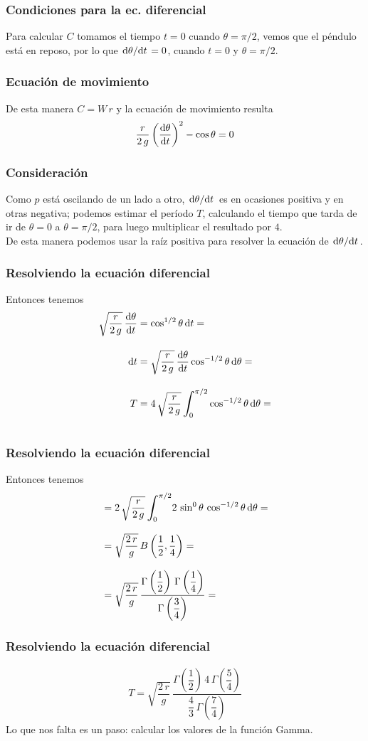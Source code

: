 \documentclass[12pt]{beamer}
\begin{document}
\begin{frame}
\frametitle{Condiciones para la ec. diferencial}
Para calcular $C$ tomamos el tiempo $t = 0$ cuando $\theta = \pi/2$, vemos que el péndulo está en reposo, por lo que $\dv*{\theta}{t} = 0$, cuando $t = 0$ y $\theta = \pi/2$.
\end{frame}
\begin{frame}
\frametitle{Ecuación de movimiento}
De esta manera $C = W \, r$ y la ecuación de movimiento resulta
\begin{align*}
\dfrac{r}{2 \, g} \left( \dv{\theta}{t} \right)^{2} - \cos \theta = 0
\end{align*}
\end{frame}
\begin{frame}
\frametitle{Consideración}
Como $p$ está oscilando de un lado a otro, $\dv*{\theta}{t}$ es en ocasiones positiva y en otras negativa; podemos estimar el período $T$, calculando el tiempo que tarda de ir de $\theta=0$ a $\theta=\pi/2$, para luego multiplicar el resultado por $4$.
\\
\bigskip
\pause
De esta manera podemos usar la raíz positiva para resolver la ecuación de $\dv*{\theta}{t}$.
\end{frame}
\begin{frame}
\frametitle{Resolviendo la ecuación diferencial}
Entonces tenemos
\begin{align*}
\sqrt{\dfrac{r}{2 \, g}} \, \dv{\theta}{t} &= \cos^{1/2} \theta \dd{t} = \\[1em]
\dd{t} &= \sqrt{\dfrac{r}{2 \, g}} \, \dv{\theta}{t} \cos^{-1/2} \theta \dd{\theta} = \\[1em]
T &= 4 \, \sqrt{\dfrac{r}{2 \, g}} \, \scaleint{6ex}_{\bs {0}}^{\pi/2} \cos^{-1/2} \theta \dd{\theta} = \\[1em]
\end{align*}
\end{frame}
\begin{frame}
\frametitle{Resolviendo la ecuación diferencial}
Entonces tenemos
\begin{align*}
&= 2 \, \sqrt{\dfrac{r}{2 \, g}} \, \scaleint{6ex}_{\bs {0}}^{\pi/2} 2 \, \sin^{0} \theta \, \cos^{-1/2} \theta \dd{\theta} = \\[0.8em]
&= \sqrt{\dfrac{2 \, r}{g}} \, B \left( \dfrac{1}{2}, \dfrac{1}{4} \right) = \\[0.8em]
&= \sqrt{\dfrac{2 \, r}{g}} \, \dfrac{\Gamma \left(\dfrac{1}{2} \right) \, \Gamma \left(\dfrac{1}{4} \right)}{\Gamma \left(\dfrac{3}{4} \right)} = 
\end{align*}
\end{frame}
\begin{frame}
\frametitle{Resolviendo la ecuación diferencial}
\begin{align*}
T = \sqrt{\dfrac{2 \, r}{g}} \, \dfrac{\Gamma \left(\dfrac{1}{2} \right) \, 4 \, \Gamma \left(\dfrac{5}{4} \right)}{\dfrac{4}{3} \, \Gamma \left(\dfrac{7}{4} \right)}
\end{align*}
Lo que nos falta es un paso: calcular los valores de la función Gamma.
\end{frame}
\end{document}
